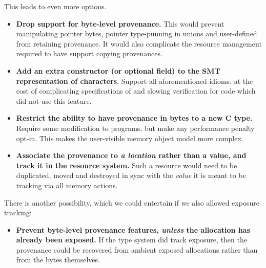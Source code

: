 This leads to even more options.
\begin{itemize}
    \item \textbf{Drop support for byte-level provenance.} This would prevent
        manipulating pointer bytes, pointer type-punning in unions and
        user-defined  from retaining provenance. It would
        also complicate the resource management required to have
         support copying provenances.
    \item \textbf{Add an extra constructor (or optional field) to the SMT
        representation of characters}. Support all aforementioned idioms, at
        the cost of complicating specifications of and slowing verification for
        code which did not use this feature.
    \item \textbf{Restrict the ability to have provenance in bytes to a new C
        type.} Require some modification to  programs, but make any
        performance penalty opt-in. This makes the user-visible memory object
        model more complex.
    \item \textbf{Associate the provenance to \emph{a location} rather than a
        value, and track it in the resource system.} Such a resource would need
        to be duplicated, moved and destroyed in sync with the \emph{value} it
        is meant to be tracking via all memory actions.
\end{itemize}

There is another possibility, which we could entertain if we also allowed
exposure tracking:
\begin{itemize}
    \item \textbf{Prevent byte-level provenance features, \emph{unless} the
        allocation has already been exposed.} If the type system did
        track exposure, then the provenance could be recovered from ambient
        exposed allocations rather than from the bytes themselves.
\end{itemize}

